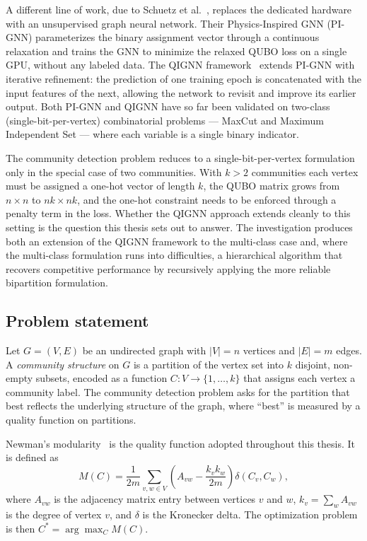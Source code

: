 A different line of work, due to Schuetz et
al.~\cite{schuetz2022combinatorial}, replaces the dedicated hardware
with an unsupervised graph neural network. Their Physics-Inspired
GNN (PI-GNN) parameterizes the binary assignment vector through a
continuous relaxation and trains the GNN to minimize the relaxed
QUBO loss on a single GPU, without any labeled data. The QIGNN
framework~\cite{qignn2026} extends PI-GNN with iterative refinement:
the prediction of one training epoch is concatenated with the input
features of the next, allowing the network to revisit and improve
its earlier output. Both PI-GNN and QIGNN have so far been validated
on two-class (single-bit-per-vertex) combinatorial problems --- MaxCut and Maximum
Independent Set --- where each variable is a single binary
indicator.

The community detection problem reduces to a single-bit-per-vertex
formulation only in the special case of two communities. With $k > 2$ communities each vertex must
be assigned a one-hot vector of length $k$, the QUBO matrix grows
from $n \times n$ to $nk \times nk$, and the one-hot constraint
needs to be enforced through a penalty term in the loss. Whether
the QIGNN approach extends cleanly to this setting is the question
this thesis sets out to answer. The investigation produces both an
extension of the QIGNN framework to the multi-class case and, where
the multi-class formulation runs into difficulties, a hierarchical
algorithm that recovers competitive performance by recursively
applying the more reliable bipartition formulation.


\subsection{Problem statement}
\label{sec:problem_statement}

Let $G = (V, E)$ be an undirected graph with $|V| = n$ vertices and
$|E| = m$ edges. A \emph{community structure} on $G$ is a partition
of the vertex set into $k$ disjoint, non-empty subsets, encoded as
a function $C: V \to \{1, \ldots, k\}$ that assigns each vertex a
community label. The community detection problem asks for the
partition that best reflects the underlying structure of the graph,
where ``best'' is measured by a quality function on partitions.

Newman's modularity~\cite{newman2006modularity} is the quality
function adopted throughout this thesis. It is defined as
\begin{equation}
    M(C) = \frac{1}{2m} \sum_{v, w \in V}
    \left( A_{vw} - \frac{k_v k_w}{2m} \right)
    \delta(C_v, C_w),
    \label{eq:modularity_intro}
\end{equation}
where $A_{vw}$ is the adjacency matrix entry between vertices $v$
and $w$, $k_v = \sum_w A_{vw}$ is the degree of vertex $v$, and
$\delta$ is the Kronecker delta. The optimization problem is then
$C^* = \arg\max_{C} M(C)$.

